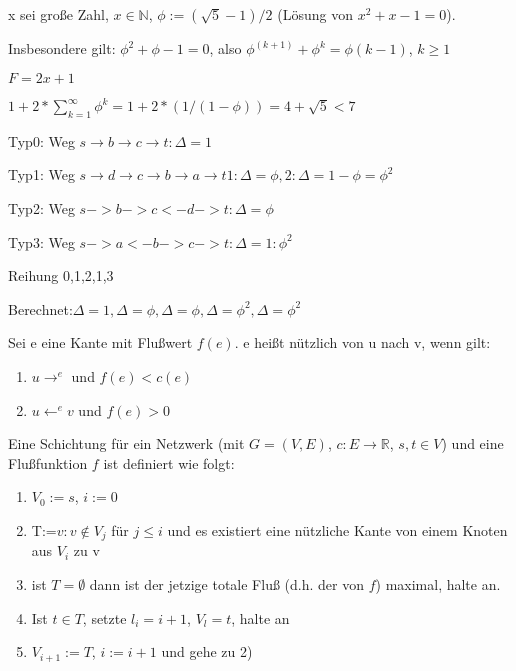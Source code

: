\begin{beispiel}
x sei große Zahl, $x \in \mathbb{N}$, $\phi:= ( \sqrt{5}-1)/2$ (Lösung von $x^2+x-1=0$).  

Insbesondere gilt: $\phi^2+ \phi-1=0$, also $\phi^(k+1)+ \phi^k = \phi(k-1)$, $k \ge 1$
%	
%	

$F= 2x +1$

$1+2* \sum_{k=1}^{\infty} \phi^k = 1 + 2*(1/(1-\phi)) = 4 + \sqrt{5} <7$

Typ0: Weg $s \rightarrow b \rightarrow c \rightarrow t : \Delta =1$

Typ1: Weg $s \rightarrow d \rightarrow c \rightarrow b \rightarrow a \rightarrow t 1: \Delta = \phi, 2:\Delta = 1-\phi = \phi^2$

Typ2: Weg $s->b->c<-d->t : \Delta = \phi$

Typ3: Weg $s->a<-b->c->t : \Delta = 1:\phi^2$

Reihung 0,1,2,1,3

Berechnet:$ \Delta =1, \Delta = \phi, \Delta = \phi, \Delta = \phi^2, \Delta = \phi^2$
\end{beispiel}
\begin{definition}
Sei e eine Kante mit Flußwert $f(e)$.  e heißt nützlich von u nach v, wenn gilt:
\begin{enumerate}
	\item $u \rightarrow^e$ und $f(e) < c(e)$
	\item $u \leftarrow^e v$ und $f(e) > 0$
\end{enumerate}
Eine Schichtung für ein Netzwerk (mit $G=(V,E)$, $c:E \rightarrow \mathbb{R}$, $s,t \in V$) und eine Flußfunktion $f$ ist definiert wie folgt:
\begin{enumerate}
	\item $V_{0}:= {s}$, $i:=0$
	\item T:={$v:v \notin V_{j}$ für $j \le i$ und es existiert eine nützliche Kante von einem Knoten aus $V_{i}$ zu v}
	\item ist $T = \emptyset$ dann ist der jetzige totale Fluß (d.h. der von $f$) maximal, halte an.
	\item Ist $t \in T$, setzte $l_{i} = i+1$, $V_{l} = {t}$, halte an
	\item $V_{i+1} := T$, $i:=i+1$ und gehe zu 2)
\end{enumerate}
\end{definition}
